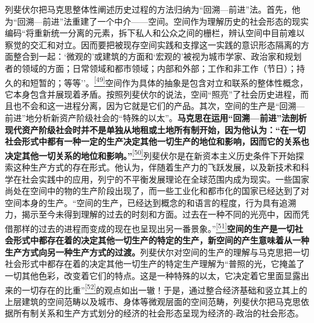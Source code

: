 \documentclass[UTF8, fontset = sourcesans, a4paper, oneside, zihao =
-4, scheme=chinese, no-math, space=true]{ctexbook}
\begin{document}
列斐伏尔把马克思整体性阐述历史过程的方法归纳为``回溯---前进''法。首先，他为``回溯---前进''法重建了一个中介------空间。空间作为理解历史的社会形态的现实编码``将重新统一分离的元素，拆下私人和公众之间的栅栏，辨认空间中目前难以察觉的交汇和对立。因而要把被现存空间实践和支撑这一实践的意识形态隔离的方面整合到一起：`微观的'或建筑的方面和`宏观的'被视为城市学家、政治家和规划者的领域的方面；日常领域和都市领域；内部和外部；工作和非工作（节日）；持久的和短暂的；等等''。\protect\hypertarget{part0010_split_002.htmlux5cux23w49}{}{}\protect\hyperlink{part0010_split_002.htmlux5cux23m49}{\textsuperscript{{[}49{]}}}空间作为具体的抽象是包含对立和联系的整体性概念，它本身包含并展现着矛盾。按照列斐伏尔的说法，空间``照亮''了社会历史进程，而且也不会和这一进程分离，因为它就是它们的产品。其次，空间的生产是``回溯---前进''地分析新资产阶级社会的``特殊的以太''。\textbf{马克思在运用``回溯---前进''法剖析现代资产阶级社会时并不是单独从地租或土地所有制开始，因为他认为：``在一切社会形式中都有一种一定的生产决定其他一切生产的地位和影响，因而它的关系也决定其他一切关系的地位和影响。''}\protect\hypertarget{part0010_split_002.htmlux5cux23w50}{}{}\protect\hyperlink{part0010_split_002.htmlux5cux23m50}{\textsuperscript{{[}50{]}}}列斐伏尔是在新资本主义历史条件下开始探索这种生产方式的存在形式。他认为，伴随着生产力的飞跃发展，以及新技术和科学在社会实践中的应用，列宁的不平衡发展理论在全球范围内成为现实。一些国家尚处在空间中的物的生产阶段出现了，而一些工业化和都市化的国家已经达到了对空间本身的生产。``空间的生产，已经达到概念的和语言的程度，行为具有追溯力，揭示至今未得到理解的过去的时刻和方面。过去在一种不同的光亮中，因而凭借那样的过去的进程而变成的现在也呈现出另一番景象。''\protect\hypertarget{part0010_split_002.htmlux5cux23w51}{}{}\protect\hyperlink{part0010_split_002.htmlux5cux23m51}{\textsuperscript{{[}51{]}}}\textbf{空间的生产是一切社会形式中都存在着的决定其他一切生产的特定的生产，新空间的产生意味着从一种生产方式向另一种生产方式的过渡。}列斐伏尔对空间的生产的理解与马克思把一切社会形式中都存在着的决定其他一切生产的特定生产理解为``普照的光，它掩盖了一切其他色彩，改变着它们的特点。这是一种特殊的以太，它决定着它里面显露出来的一切存在的比重''\protect\hypertarget{part0010_split_002.htmlux5cux23w52}{}{}\protect\hyperlink{part0010_split_002.htmlux5cux23m52}{\textsuperscript{{[}52{]}}}的观点如出一辙！于是，通过整合经济基础和竖立其上的上层建筑的空间范畴以及城市、身体等微观层面的空间范畴，列斐伏尔把马克思依据所有制关系和生产方式划分的经济的社会形态呈现为经济的-政治的社会形态。
\end{document}
